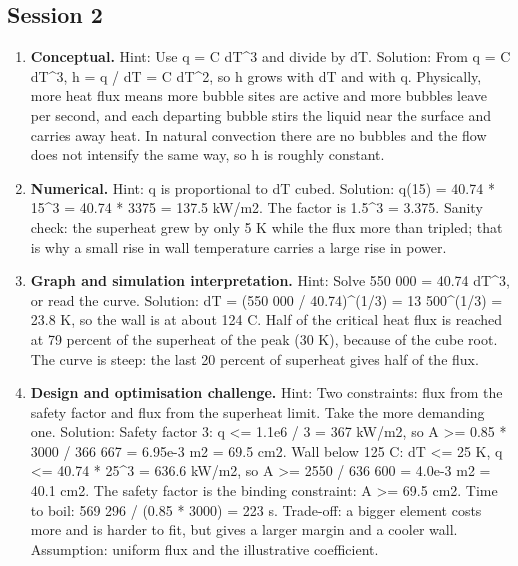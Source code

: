 \documentclass[11pt,a4paper]{article}
\begin{document}
\subsection*{Session 2}
\begin{enumerate}[nosep]
\item \textbf{Conceptual.} Hint: Use q = C dT\textasciicircum{}3 and divide by dT. Solution: From q = C dT\textasciicircum{}3, h = q / dT = C dT\textasciicircum{}2, so h grows with dT and with q. Physically, more heat flux means more bubble sites are active and more bubbles leave per second, and each departing bubble stirs the liquid near the surface and carries away heat. In natural convection there are no bubbles and the flow does not intensify the same way, so h is roughly constant.
\item \textbf{Numerical.} Hint: q is proportional to dT cubed. Solution: q(15) = 40.74 * 15\textasciicircum{}3 = 40.74 * 3375 = 137.5 kW/m2. The factor is 1.5\textasciicircum{}3 = 3.375. Sanity check: the superheat grew by only 5 K while the flux more than tripled; that is why a small rise in wall temperature carries a large rise in power.
\item \textbf{Graph and simulation interpretation.} Hint: Solve 550 000 = 40.74 dT\textasciicircum{}3, or read the curve. Solution: dT = (550 000 / 40.74)\textasciicircum{}(1/3) = 13 500\textasciicircum{}(1/3) = 23.8 K, so the wall is at about 124 C. Half of the critical heat flux is reached at 79 percent of the superheat of the peak (30 K), because of the cube root. The curve is steep: the last 20 percent of superheat gives half of the flux.
\item \textbf{Design and optimisation challenge.} Hint: Two constraints: flux from the safety factor and flux from the superheat limit. Take the more demanding one. Solution: Safety factor 3: q \textless{}= 1.1e6 / 3 = 367 kW/m2, so A \textgreater{}= 0.85 * 3000 / 366 667 = 6.95e-3 m2 = 69.5 cm2. Wall below 125 C: dT \textless{}= 25 K, q \textless{}= 40.74 * 25\textasciicircum{}3 = 636.6 kW/m2, so A \textgreater{}= 2550 / 636 600 = 4.0e-3 m2 = 40.1 cm2. The safety factor is the binding constraint: A \textgreater{}= 69.5 cm2. Time to boil: 569 296 / (0.85 * 3000) = 223 s. Trade-off: a bigger element costs more and is harder to fit, but gives a larger margin and a cooler wall. Assumption: uniform flux and the illustrative coefficient.
\end{enumerate}
\end{document}
